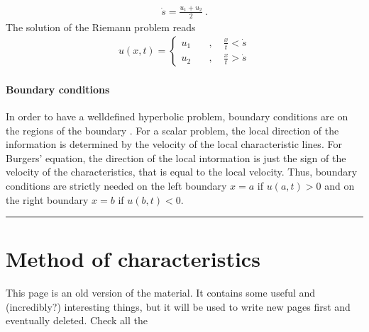 \documentclass[letterpaper,10pt,english]{jupyterBook}
\begin{document}
\begin{equation*}
\begin{split}\dot{s} = \frac{u_1 + u_2}{2} \ .\end{split}
\end{equation*}
\sphinxAtStartPar
The solution of the Riemann problem reads
\begin{equation*}
\begin{split}u(x,t) = \left\{ \begin{aligned} 
  u_1         \quad & , \quad  \frac{x}{t} < \dot{s} \\
  u_2         \quad & , \quad  \frac{x}{t} > \dot{s}
\end{aligned} \right.\end{split}
\end{equation*}

\paragraph{Boundary conditions}
\label{\detokenize{ch/pde/hyperbolic-1d-scalar-nonlinear:boundary-conditions}}\label{\detokenize{ch/pde/hyperbolic-1d-scalar-nonlinear:pde-hyperbolic-problems-scalar-nonlinear-examples-burgers-boundary-conditions}}
\sphinxAtStartPar
In order to have a well\sphinxhyphen{}defined hyperbolic problem, boundary conditions are  on the regions of the boundary . For a scalar problem, the local direction of the information is determined by the velocity of the local characteristic lines. For Burgers’ equation, the direction of the local intormation is just the sign of the velocity of the characteristics, that is equal to the local velocity. Thus, boundary conditions are strictly needed on the left boundary \(x = a\) if \(u(a, t) > 0\) and on the right boundary \(x = b\) if \(u(b, t) < 0\).


\bigskip\hrule\bigskip


\sphinxstepscope


\section{Method of characteristics}
\label{\detokenize{ch/pde/characteristics:method-of-characteristics}}\label{\detokenize{ch/pde/characteristics:pde-hyperbolic-characteristics}}\label{\detokenize{ch/pde/characteristics::doc}}
\sphinxAtStartPar
 This page is an old version of the material. It contains some useful and (incredibly?) interesting things, but it will be used to write new pages first and eventually deleted. Check all the 
\end{document}
